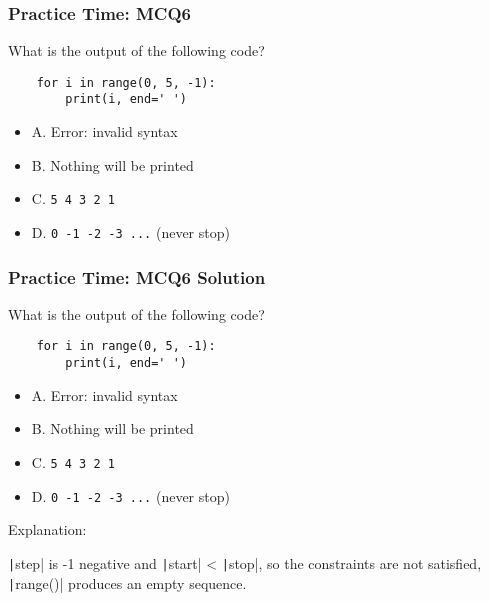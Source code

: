 \documentclass{beamer}
\begin{document}
\begin{frame}[fragile]
    \frametitle{Practice Time: MCQ6}
    What is the output of the following code?
    \begin{verbatim}
    for i in range(0, 5, -1):
        print(i, end=' ')
    \end{verbatim}
    \begin{itemize}
        \item A. Error: invalid syntax
        \item B. Nothing will be printed
        \item C. \texttt{5 4 3 2 1}
        \item D. \texttt{0 -1 -2 -3 ...} (never stop)
    \end{itemize}
\end{frame}
\begin{frame}[fragile]
    \frametitle{Practice Time: MCQ6 Solution}
    What is the output of the following code?
    \begin{verbatim}
    for i in range(0, 5, -1):
        print(i, end=' ')
    \end{verbatim}
    \begin{itemize}
        \item A. Error: invalid syntax
        \item \alert{B. Nothing will be printed}
        \item C. \texttt{5 4 3 2 1}
        \item D. \texttt{0 -1 -2 -3 ...} (never stop)
    \end{itemize}

    Explanation:

    \texttt|step| is -1 negative and \texttt|start| < \texttt|stop|,
    so the constraints are not satisfied, \texttt|range()| produces an empty sequence.
\end{frame}
\end{document}
